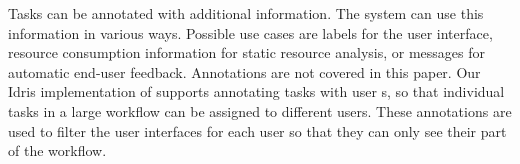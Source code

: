 Tasks can be annotated with additional information.
The system can use this information in various ways.
Possible use cases are labels for the user interface, resource consumption information for static resource analysis, or messages for automatic end-user feedback.
Annotations are not covered in this paper.
Our Idris implementation of \TOPHAT supports annotating tasks with user \ID{}s, so that individual tasks in a large workflow can be assigned to different users.
These annotations are used to filter the user interfaces for each user so that they can only see their part of the workflow.


%
%
%
%
